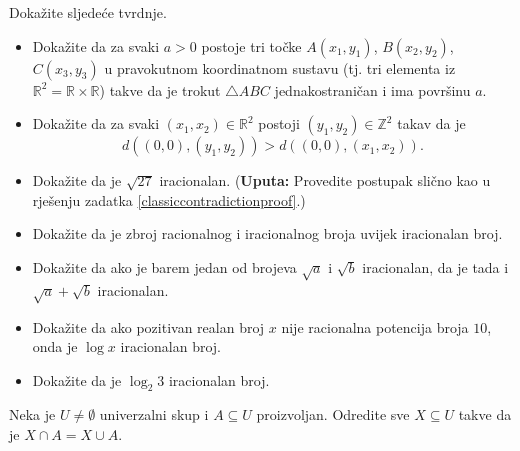 \begin{exercise}{\unskip} Dokažite sljedeće tvrdnje.
\begin{itemize}
\item[a)] Dokažite da za svaki \(a>0\) postoje tri točke \(A(x_1, y_1)\), \(B(x_2, y_2)\), \(C(x_3, y_3)\) u pravokutnom koordinatnom sustavu (tj. tri elementa iz \(\mathbb{R}^2=\mathbb{R}\times\mathbb{R}\)) takve da je trokut \(\triangle ABC\) jednakostraničan i ima površinu \(a\).
\item[b)] Dokažite da za svaki \((x_1, x_2)\in \mathbb{R}^2\) postoji \((y_1, y_2)\in \mathbb{Z}^2\) takav da je \[d\left(\left(0, 0\right), \left(y_1, y_2\right)\right)>d\left(\left(0, 0\right), \left(x_1, x_2\right)\right).\]
\item[c)] Dokažite da je \(\sqrt{27}\) iracionalan. (\textbf{Uputa:} Provedite postupak slično kao u rješenju zadatka \ref{classiccontradictionproof}.)
\item[d)] Dokažite da je zbroj racionalnog i iracionalnog broja uvijek iracionalan broj.
\item[e)] Dokažite da ako je barem jedan od brojeva \(\sqrt{a}\) i \(\sqrt{b}\) iracionalan, da je tada i \(\sqrt{a}+\sqrt{b}\) iracionalan.
\item[f)] Dokažite da ako pozitivan realan broj \(x\) nije racionalna potencija broja \(10\), onda je \(\log{x}\) iracionalan broj.
\item[g)] Dokažite da je \(\log_2{3}\) iracionalan broj.
\end{itemize}
\end{exercise}
\begin{exercise}{\unskip}
Neka je \(U\neq \emptyset\) univerzalni skup i \(A\subseteq U\) proizvoljan. Odredite sve \(X\subseteq U\) takve da je \(X\cap A=X\cup A\).
\end{exercise}

\large
